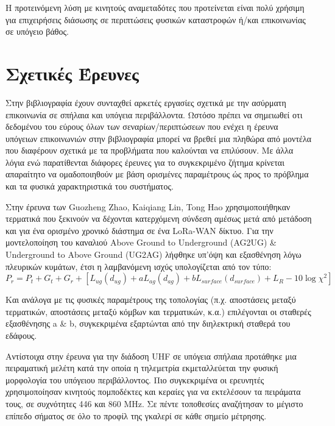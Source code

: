 \documentclass[12pt, greek]{article}
\begin{document}
\begin{multicols*}{2}
        Η προτεινόμενη λύση με κινητούς αναμεταδότες που προτείνεται είναι πολύ χρήσιμη
        για επιχειρήσεις διάσωσης σε περιπτώσεις φυσικών καταστροφών ή/και επικοινωνίας σε
        υπόγειο βάθος.

    \section{\normalsize \textsf{Σχετικές Έρευνες}} Στην βιβλιογραφία έχουν συνταχθεί
        αρκετές εργασίες σχετικά με την ασύρματη επικοινωνία σε σπήλαια και υπόγεια
        περιβάλλοντα. Ωστόσο πρέπει να σημειωθεί οτι δεδομένου του εύρους όλων των 
        σεναρίων/περιπτώσεων που ενέχει η έρευνα υπόγειων επικοινωνιών στην βιβλιογραφία
        μπορεί να βρεθεί μια πληθώρα από μοντέλα που διαφέρουν σχετικά με τα προβλήματα που
        καλούνται να επιλύσουν. Με άλλα λόγια ενώ παρατίθενται διάφορες έρευνες για το 
        συγκεκριμένο ζήτημα κρίνεται απαραίτητο να ομαδοποιηθούν με βάση ορισμένες παραμέτρους
        ώς προς το πρόβλημα και τα φυσικά χαρακτηριστικά του συστήματος.
        
        Στην έρευνα των Guozheng Zhao, Kaiqiang Lin, Tong Hao \cite{zhao_feasibility_2023}
        χρησιμοποιήθηκαν τερματικά που ξεκινούν να δέχονται κατερχόμενη σύνδεση αμέσως μετά 
        από μετάδοση και για ένα ορισμένο χρονικό διάστημα σε ένα LoRa-WAN δίκτυο.
        Για την μοντελοποίηση του καναλιού Above Ground to Underground (AG2UG) \& 
        Underground to Above Ground (UG2AG) λήφθηκε υπ'όψη και εξασθένηση λόγω πλευρικών
        κυμάτων, έτσι η λαμβανόμενη ισχύς υπολογίζεται από τον τύπο:\\
        \begin{equation} \label{eq:1}
            P_r = P_t + G_t + G_r + [L_{ug}(d_{ug}) + aL_{ag}(d_{ag}) + bL_{surface}(d_{surface}) + L_R - 10\log\chi^2]    
        \end{equation} 
        
        Και ανάλογα με τις φυσικές παραμέτρους της τοπολογίας (π.χ. αποστάσεις μεταξύ
        τερματικών, αποστάσεις μεταξύ κόμβων και τερματικών, κ.α.) επιλέγονται οι 
        σταθερές εξασθένησης a \& b, συγκεκριμένα εξαρτώνται από την διηλεκτρική 
        σταθερά του εδάφους.

        Αντίστοιχα στην έρευνα για την διάδοση UHF σε υπόγεια σπήλαια \cite{rak_uhf_2007}
        προτάθηκε μια πειραματική μελέτη κατά την οποία η τηλεμετρία εκμεταλλεύεται την φυσική
        μορφολογία του υπόγειου περιβάλλοντος. Πιο συγκεκριμένα οι ερευνητές χρησιμοποίησαν
        κινητούς πομποδέκτες και κεραίες για να εκτελέσουν τα πειράματα τους, σε συχνότητες 
        446 και 860 MHz. Σε πέντε τοποθεσίες αναζήτησαν το μέγιστο επίπεδο σήματος σε όλο το
        προφίλ της γκαλερί σε κάθε σημείο μέτρησης.


\end{multicols*}
\end{document}
